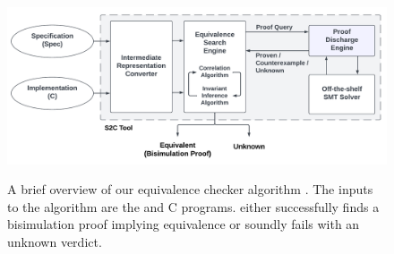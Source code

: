 \begin{figure}
\begin{center}
{\includegraphics[scale=0.50]{chapters/figures/figDiagram.pdf}}
\end{center}
\caption{\label{fig:diagram}A brief overview of our equivalence checker algorithm \toolName{}.
The inputs to the algorithm are the \SpecL{} and C programs.
\toolName{} either successfully finds a bisimulation proof implying equivalence or
soundly fails with an unknown verdict.}
\end{figure}